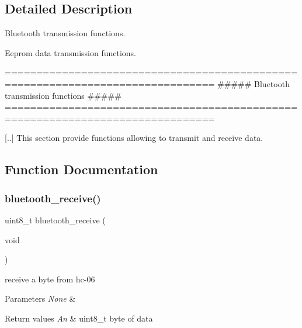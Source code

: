 \subsection{Detailed Description}
Bluetooth transmission functions. 

Eeprom data transmission functions.

\begin{DoxyVerb} ===============================================================================
         ##### Bluetooth transmission functions #####
 ===============================================================================

 [..] This section provide functions allowing to transmit and receive data.\end{DoxyVerb}
 

\subsection{Function Documentation}
\mbox{\label{group___transmission_gab7ad1e1b94cf1cedc8a8e5151b0e25cb}} 
\subsubsection{\texorpdfstring{bluetooth\+\_\+receive()}{bluetooth\_receive()}}
{\footnotesize\ttfamily uint8\+\_\+t bluetooth\+\_\+receive (\begin{DoxyParamCaption}\item[{void}]{ }\end{DoxyParamCaption})}



receive a byte from hc-\/06 


\begin{DoxyParams}{Parameters}
{\em None} & \\
\hline
\end{DoxyParams}

\begin{DoxyRetVals}{Return values}
{\em An} & uint8\+\_\+t byte of data \\
\hline
\end{DoxyRetVals}
\mbox{\label{group___transmission_ga31d829d5658369ee2c90b9c3cdbedfe1}} 
